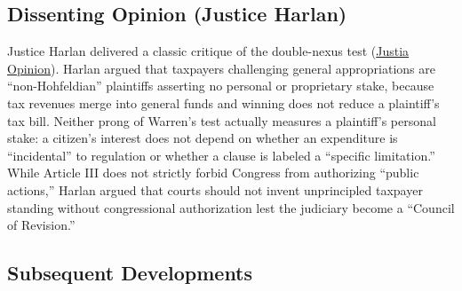 \documentclass[12pt]{article}
\begin{document}
\subsection{Dissenting Opinion (Justice Harlan)}

Justice Harlan delivered a classic critique of the double-nexus test (\href{https://supreme.justia.com/cases/federal/us/392/83/}{Justia Opinion}). Harlan argued that taxpayers challenging general appropriations are ``non-Hohfeldian'' plaintiffs asserting no personal or proprietary stake, because tax revenues merge into general funds and winning does not reduce a plaintiff's tax bill. Neither prong of Warren's test actually measures a plaintiff's personal stake: a citizen's interest does not depend on whether an expenditure is ``incidental'' to regulation or whether a clause is labeled a ``specific limitation.'' While Article III does not strictly forbid Congress from authorizing ``public actions,'' Harlan argued that courts should not invent unprincipled taxpayer standing without congressional authorization lest the judiciary become a ``Council of Revision.''

\subsection{Subsequent Developments}
\end{document}
